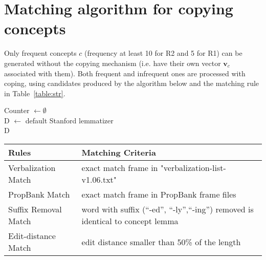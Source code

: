 \documentclass[11pt,a4paper]{article}
\begin{document}
\section{Matching algorithm for copying concepts}

Only frequent concepts $c$ (frequency at least 10 for R2 and 5 for R1) can be generated without the copying mechanism (i.e. have their own vector $\mathbf{v}_c$ associated with them). Both frequent and infrequent ones are processed with coping, using candidates produced by the algorithm below and the matching rule in Table~\ref{table:str}.



{
\linespread{1}
\begin{algorithm}
\SetAlgoLined
{}
Counter $\leftarrow \emptyset$ \\

 D $\leftarrow $ default Stanford lemmatizer\\
 \Return D
 \caption{Copy function construction} \label{construct}
\end{algorithm}
}

\begin{table*}[ht!]
    \begin{center} 
        \begin{tabular}{ll} 
            \hline  Rules &   Matching Criteria \\  \hline
             Verbalization Match & exact match frame in "verbalization-list-v1.06.txt"\\
            PropBank  Match  & exact match frame in PropBank frame files\\
             Suffix Removal Match  &word with suffix (``-ed'', ``-ly'',``-ing'') removed is identical to concept lemma\\
             Edit-distance Match  &edit distance smaller than 50\% of the length  \\
            \hline
        \end{tabular}
    \end{center}
	\caption{\label{table:str} Matching rules for Algorithm 1}
\end{table*}
\end{document}
